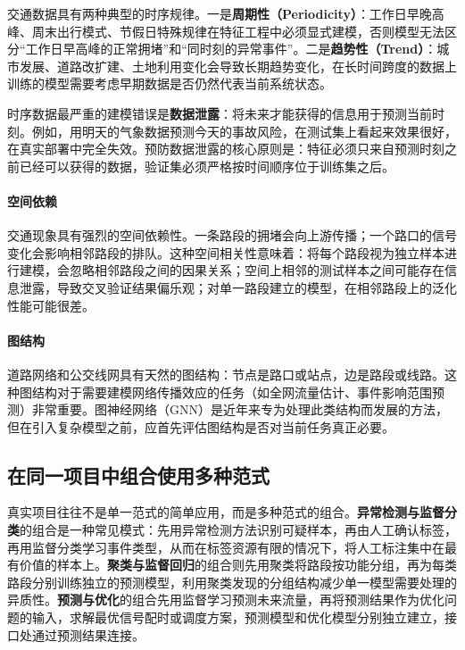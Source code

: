 交通数据具有两种典型的时序规律。一是\textbf{周期性（Periodicity）}：工作日早晚高峰、周末出行模式、节假日特殊规律在特征工程中必须显式建模，否则模型无法区分“工作日早高峰的正常拥堵”和“同时刻的异常事件”。二是\textbf{趋势性（Trend）}：城市发展、道路改扩建、土地利用变化会导致长期趋势变化，在长时间跨度的数据上训练的模型需要考虑早期数据是否仍然代表当前系统状态。

时序数据最严重的建模错误是\textbf{数据泄露}：将未来才能获得的信息用于预测当前时刻。例如，用明天的气象数据预测今天的事故风险，在测试集上看起来效果很好，在真实部署中完全失效。预防数据泄露的核心原则是：特征必须只来自预测时刻之前已经可以获得的数据，验证集必须严格按时间顺序位于训练集之后。

\paragraph{空间依赖}

交通现象具有强烈的空间依赖性。一条路段的拥堵会向上游传播；一个路口的信号变化会影响相邻路段的排队。这种空间相关性意味着：将每个路段视为独立样本进行建模，会忽略相邻路段之间的因果关系；空间上相邻的测试样本之间可能存在信息泄露，导致交叉验证结果偏乐观；对单一路段建立的模型，在相邻路段上的泛化性能可能很差。

\paragraph{图结构}

道路网络和公交线网具有天然的图结构：节点是路口或站点，边是路段或线路。这种图结构对于需要建模网络传播效应的任务（如全网流量估计、事件影响范围预测）非常重要。图神经网络（GNN）是近年来专为处理此类结构而发展的方法，但在引入复杂模型之前，应首先评估图结构是否对当前任务真正必要。

\subsection{在同一项目中组合使用多种范式}

真实项目往往不是单一范式的简单应用，而是多种范式的组合。\textbf{异常检测与监督分类}的组合是一种常见模式：先用异常检测方法识别可疑样本，再由人工确认标签，再用监督分类学习事件类型，从而在标签资源有限的情况下，将人工标注集中在最有价值的样本上。\textbf{聚类与监督回归}的组合则先用聚类将路段按功能分组，再为每类路段分别训练独立的预测模型，利用聚类发现的分组结构减少单一模型需要处理的异质性。\textbf{预测与优化}的组合先用监督学习预测未来流量，再将预测结果作为优化问题的输入，求解最优信号配时或调度方案，预测模型和优化模型分别独立建立，接口处通过预测结果连接。

